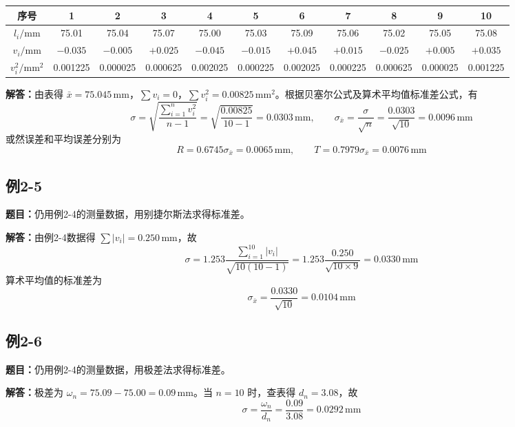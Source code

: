 \documentclass[UTF8,zihao=-4]{ctexart}
\newcommand{\problem}[1]{\subsection*{#1}}
\newcommand{\timu}{\noindent\textbf{题目：}}
\newcommand{\jieda}{\noindent\textbf{解答：}}
\begin{document}
\begin{center}
\scriptsize
\setlength{\tabcolsep}{6pt}
\begin{tabular}{c|cccccccccc}
\toprule
序号 & 1 & 2 & 3 & 4 & 5 & 6 & 7 & 8 & 9 & 10\\
\midrule
$l_i/\mathrm{mm}$ & 75.01 & 75.04 & 75.07 & 75.00 & 75.03 & 75.09 & 75.06 & 75.02 & 75.05 & 75.08\\
$v_i/\mathrm{mm}$ & $-0.035$ & $-0.005$ & $+0.025$ & $-0.045$ & $-0.015$ & $+0.045$ & $+0.015$ & $-0.025$ & $+0.005$ & $+0.035$\\
$v_i^2/\mathrm{mm}^2$ & 0.001225 & 0.000025 & 0.000625 & 0.002025 & 0.000225 & 0.002025 & 0.000225 & 0.000625 & 0.000025 & 0.001225\\
\bottomrule
\end{tabular}
\end{center}

\jieda 由表得 $\bar{x}=75.045\,\mathrm{mm}$，$\sum v_i=0$，$\sum v_i^2=0.00825\,\mathrm{mm}^2$。根据贝塞尔公式及算术平均值标准差公式，有
\begin{equation*}
    \sigma=\sqrt{\frac{\sum_{i=1}^{n} v_i^2}{n-1}}=\sqrt{\frac{0.00825}{10-1}}=0.0303\,\mathrm{mm},\qquad
    \sigma_{\bar{x}}=\frac{\sigma}{\sqrt{n}}=\frac{0.0303}{\sqrt{10}}=0.0096\,\mathrm{mm}
\end{equation*}
或然误差和平均误差分别为
\begin{equation*}
    R=0.6745\sigma_{\bar{x}}=0.0065\,\mathrm{mm},\qquad
    T=0.7979\sigma_{\bar{x}}=0.0076\,\mathrm{mm}
\end{equation*}

\problem{例2-5}
\timu 仍用例2-4的测量数据，用别捷尔斯法求得标准差。

\jieda 由例2-4数据得 $\sum |v_i|=0.250\,\mathrm{mm}$，故
\begin{equation*}
    \sigma=1.253\frac{\sum_{i=1}^{10}|v_i|}{\sqrt{10(10-1)}}
    =1.253\frac{0.250}{\sqrt{10\times9}}=0.0330\,\mathrm{mm}
\end{equation*}
算术平均值的标准差为
\begin{equation*}
    \sigma_{\bar{x}}=\frac{0.0330}{\sqrt{10}}=0.0104\,\mathrm{mm}
\end{equation*}

\problem{例2-6}
\timu 仍用例2-4的测量数据，用极差法求得标准差。

\jieda 极差为 $\omega_n=75.09-75.00=0.09\,\mathrm{mm}$。当 $n=10$ 时，查表得 $d_n=3.08$，故
\begin{equation*}
    \sigma=\frac{\omega_n}{d_n}=\frac{0.09}{3.08}=0.0292\,\mathrm{mm}
\end{equation*}
\end{document}
